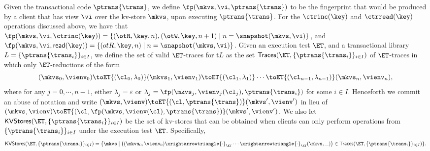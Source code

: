 Given the transactional code 
$\ptrans{\trans}$, we define $\fp(\mkvs, \vi, \ptrans{\trans})$ 
to be the fingerprint that would be produced by a client that has view $\vi$ 
over the kv-store $\mkvs$, upon executing $\ptrans{\trans}$.
For the $\ctrinc(\key)$ and $\ctrread(\key)$ operations discussed above, 
we have that 
$\fp(\mkvs, \vi, \ctrinc(\key)) = \{(\otR, \key, n), (\otW, \key, n+1) \mid 
n = \snapshot(\mkvs, \vi)\}$, and $\fp(\mkvs, \vi ,\mathsf{read}(\key)) = 
\{(otR, \key, n) \mid n = \snapshot(\mkvs, \vi)\}$.
Given an execution test $\ET$, and a transactional library $L = \{\ptrans{\trans_i}\}_{i \in I}$, 
we define the set of valid $\ET$-traces for t$L$ as the set 
$\mathsf{Traces}(\ET, \{\ptrans{\trans_i}\}_{i \in I})$ 
of $\ET$-traces in which only $\ET$-reductions of the form 
\[
(\mkvs_{0}, \vienv_{0}) \toET{(\cl_0, \lambda_0)} (\mkvs_{1}, \vienv_{1}) \toET{(\cl_1, \lambda_1)} \cdots 
\toET{(\cl_{n-1}, \lambda_{n-1})} (\mkvs_{n}, \vienv_{n}),
\]
where for any $j=0,\cdots,n-1$, either $\lambda_{j} = \varepsilon$ or $\lambda_{j} = \fp(\mkvs_{j}, \vienv_{j}(\cl_{j}), \ptrans{\trans_{i}})$ 
for some $i \in I$. Henceforth we commit an abuse of notation and write $(\mkvs, \vienv) \toET{(\cl, \ptrans{\trans})} (\mkvs', \vienv')$ 
in lieu of $(\mkvs, \vienv) \toET{(\cl, \fp(\mkvs,\vienv(\cl), \ptrans{\trans})} (\mkvs', \vienv')$.
We also let $\mathsf{KVStores}(\ET, \{\ptrans{\trans_i}\}_{i \in I})$ be the set of kv-stores 
that can be obtained when clients can only perform operations from $\{\ptrans{\trans_i}\}_{i \in I}$ 
under the execution test $\ET$. Specifically, 
\[
\mathsf{KVStores}(\ET, \{\ptrans{\trans_i}\}_{i \in I}) = \{ \mkvs \mid \left( (\mkvs_0, \vienv_{0}) \xrightarrowtriangle{\cdot}_{\ET} \cdots 
\xrightarrowtriangle{\cdot}_{\ET} (\mkvs, \_)\right) \in \mathsf{Traces}(\ET, \{\ptrans{\trans_{i}}\}_{i \in I}) \}.
\]

